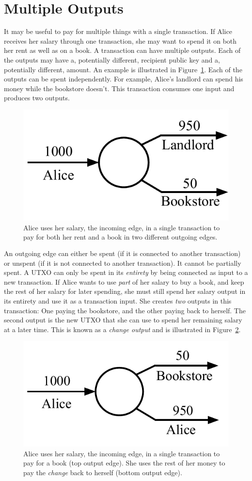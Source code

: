 \section{Multiple Outputs}

It may be useful to pay for multiple things with a single transaction. If Alice receives
her salary through one transaction, she may want to spend it on both her rent as well
as on a book. A transaction can have multiple outputs. Each of the outputs may have a,
potentially different, recipient public key and a, potentially different, amount.
An example is illustrated in
Figure~\ref{fig.utxo-multiple-outputs}. Each of the outputs can be spent independently.
For example, Alice's landlord can spend his money while the bookstore doesn't. This
transaction consumes one input and produces two outputs.

\begin{figure}[h]
    \centering
    \includegraphics[width=0.35 \columnwidth,keepaspectratio]{figures/utxo-multiple-outputs.pdf}
    \caption{Alice uses her salary, the incoming edge, in a single transaction to pay for
             both her rent and a book in two different outgoing edges.}
    \label{fig.utxo-multiple-outputs}
\end{figure}

An outgoing edge can either be spent (if it is connected to another transaction) or
unspent (if it is not connected to another transaction). It cannot be partially spent.
A UTXO can only be spent in its \emph{entirety} by being connected as input to a new
transaction. If Alice wants to use \emph{part} of her salary to buy a book, and keep
the rest of her salary for later spending, she must still spend her salary output
in its entirety and use it as a transaction input. She creates \emph{two} outputs
in this transaction: One paying the bookstore, and the other paying back to herself.
The second output is the new UTXO that she can use to spend her remaining salary
at a later time. This is known as a \emph{change output} and is
illustrated in Figure~\ref{fig.utxo-change}.

\begin{figure}[h]
    \centering
    \includegraphics[width=0.35 \columnwidth,keepaspectratio]{figures/utxo-change.pdf}
    \caption{Alice uses her salary, the incoming edge, in a single transaction to pay for
             a book (top output edge). She uses the rest of her money to pay the
             \emph{change} back to herself (bottom output edge).}
    \label{fig.utxo-change}
\end{figure}

